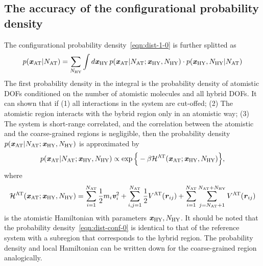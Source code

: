 \documentclass[epjST]{svjour}
\newcommand{\vect}[1]{\textbf{\textit{#1}}}
\newcommand{\mh}[0]{\mathcal {H}}
\newcommand{\AT}[0]{\textrm{AT}}
\newcommand{\HY}[0]{\textrm{HY}}
\begin{document}
\subsection{The accuracy of the configurational probability density}
The configurational probability density~\ref{eqn:dist-1-0} is further splitted as
\begin{align}
  p(\vect x_\AT \vert N_\AT) =
  \sum_{N_\HY} \int {d}\vect x_\HY\,
  p(\vect x_\AT \vert N_\AT; \vect x_\HY, N_\HY)\cdot
  p(\vect x_\HY, N_\HY\vert N_\AT)  
\end{align}
The first probability density in the integral is the probability density
of atomistic DOFs conditioned on the number of atomistic molecules and all
hybrid DOFs.
It can shown that if
(1) all interactions in the system are cut-offed;
(2) The atomistic region interacts with the bybrid region only in an atomistic way;
(3) The system is short-range correlated, and the correlation between the atomistic
and the coarse-grained regions is negligible, then the probability density $p(\vect x_\AT \vert N_\AT; \vect x_\HY, N_\HY)$
is approximated by
\begin{align}\label{eqn:dist-conf-0}
  p(\vect x_\AT \vert N_\AT; \vect x_\HY, N_\HY)
  \propto
  \exp\Big\{-\beta \mh^\AT(\vect x_\AT; \vect x_\HY, N_\HY) \Big\},
\end{align}
where 
\begin{align}
  \mh^\AT(\vect x_\AT; \vect x_\HY, N_\HY)
  =
  \sum_{i=1}^{N_\AT}\frac12 m_i\vect v_i^2 +
  \sum_{i,j=1}^{N_\AT} \frac12 V^\AT(\vect r_{ij}) +
  \sum_{i=1}^{N_\AT}\sum_{j=N_\AT+1}^{N_\AT + N_\HY} V^\AT(\vect r_{ij})
\end{align}
is the atomistic Hamiltonian with parameters $\vect x_\HY, N_\HY$. It
should be noted that the probability density~\eqref{eqn:dist-conf-0}
is identical to that of the reference system with a subregion that
corresponds to the hybrid region.
The probability density and local Hamiltonian
can be written down for the coarse-grained region analogically.
\end{document}
